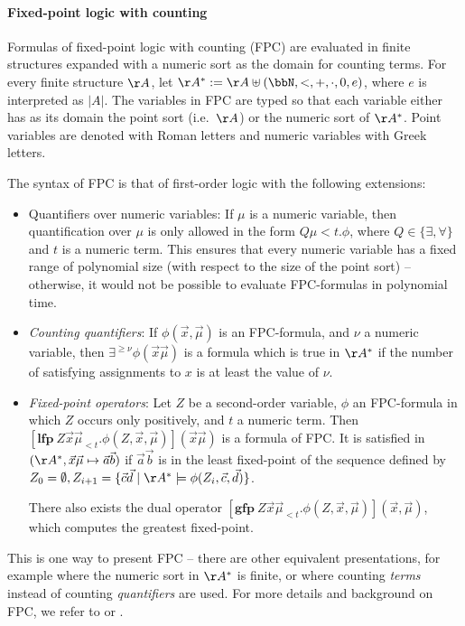 \documentclass[a4paper,UKenglish,cleveref, autoref, thm-restate]{lipics-v2021}
\begin{document}
	\paragraph*{Fixed-point logic with counting}
	
	Formulas of fixed-point logic with counting (FPC) are evaluated in finite structures expanded with a numeric sort as the domain for counting terms. 
	For every finite structure $\AA$, let $\AA^* := \AA \uplus (\bbN, <, +, \cdot, 0, e)$, where $e$ is interpreted as $|A|$. The variables in FPC are typed so that each variable either has as its domain the point sort (i.e.\ $\AA$) or the numeric sort of $\AA^*$. Point variables are denoted with Roman letters and numeric variables with Greek letters.
	
	The syntax of FPC is that of first-order logic with the following extensions:
	\begin{itemize}
		\item Quantifiers over numeric variables: If $\mu$ is a numeric variable, then quantification over $\mu$ is only allowed in the form $Q \mu < t. \phi$, where $Q \in \{\exists, \forall\}$ and $t$ is a numeric term. This ensures that every numeric variable has a fixed range of polynomial size (with respect to the size of the point sort) -- otherwise, it would not be possible to evaluate FPC-formulas in polynomial time.
		\item \emph{Counting quantifiers}: If $\phi(\vec x, \vec \mu)$ is an FPC-formula, and $\nu$ a numeric variable, then $\exists^{\geq \nu}\phi(\vec x \vec \mu)$ is a formula which is true in $\AA^*$ if the number of satisfying assignments to $x$ is at least the value of $\nu$.
		\item \emph{Fixed-point operators}: Let $Z$ be a second-order variable, $\phi$ an FPC-formula in which $Z$ occurs only positively, and $t$ a numeric term. Then $[\mathbf{lfp}~ Z \vec x \vec \mu_{<t} . \phi(Z, \vec x, \vec \mu)](\vec x \vec \mu)$ is a formula of FPC. It is satisfied in $(\AA^*,\vec x \vec \mu \mapsto \vec a \vec b)$ if $\vec a \vec b$ is in the least fixed-point of the sequence defined by $Z_0 = \emptyset, Z_{i+1} = \{ \vec c \vec d  \mid \AA^* \models  \phi(Z_i, \vec c, \vec d)  \}$.
		
		There also exists the dual operator 
		$[\mathbf{gfp}~ Z \vec x \vec \mu_{<t} . \phi(Z,\vec x, \vec \mu)](\vec x, \vec \mu)$, which computes the greatest fixed-point.
	\end{itemize}	 
	
	This is one way to present FPC -- there are other equivalent presentations, for example where the numeric sort in $\AA^*$ is finite, or where counting \emph{terms} instead of counting \emph{quantifiers} are used. For more details and background on FPC, we refer to \cite{otto1997bounded} or \cite{dawar2015nature}. 
	
\end{document}
